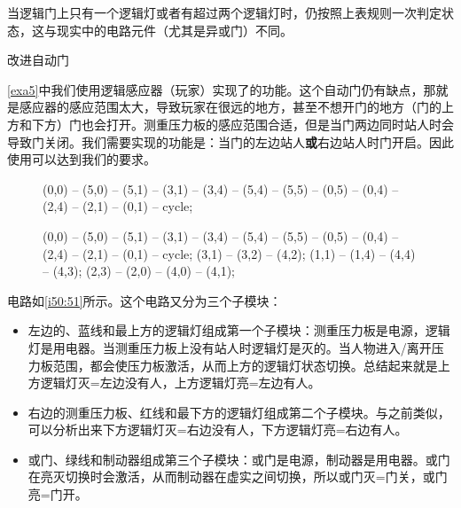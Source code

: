 \begin{remark*}{}{}
  当逻辑门上只有一个逻辑灯或者有超过两个逻辑灯时，仍按照上表规则一次判定状态，这与现实中的电路元件（尤其是异或门）不同。
\end{remark*}

\begin{example}{改进自动门}{}

  \autoref{exa5}中我们使用逻辑感应器（玩家）实现了的功能。这个自动门仍有缺点，那就是感应器的感应范围太大，导致玩家在很远的地方，甚至不想开门的地方（门的上方和下方）门也会打开。测重压力板的感应范围合适，但是当门两边同时站人时会导致门关闭。我们需要实现的功能是：当门的左边站人\textbf{或}右边站人时门开启。因此使用可以达到我们的要求。

  \begin{figure}[H]
    \centering
    \begin{tikzpictureC}[TRsch]
       (0,0) -- (5,0) -- (5,1) -- (3,1) -- (3,4) -- (5,4) -- (5,5) -- (0,5) -- (0,4) -- (2,4) -- (2,1) -- (0,1) -- cycle;
    \end{tikzpictureC}%
    \begin{tikzpictureC}[TRsch]
       (0,0) -- (5,0) -- (5,1) -- (3,1) -- (3,4) -- (5,4) -- (5,5) -- (0,5) -- (0,4) -- (2,4) -- (2,1) -- (0,1) -- cycle;
       (3,1) -- (3,2) -- (4,2);
       (1,1) -- (1,4) -- (4,4) -- (4,3);
       (2,3) -- (2,0) -- (4,0) -- (4,1);
    \end{tikzpictureC}%
    \caption{}
    \label{i50:51}
  \end{figure}

  电路如\autoref{i50:51}所示。这个电路又分为三个子模块：
  \begin{itemize}
    \item 左边的、蓝线和最上方的逻辑灯组成第一个子模块：测重压力板是电源，逻辑灯是用电器。当测重压力板上没有站人时逻辑灯是灭的。当人物进入/离开压力板范围，都会使压力板激活，从而上方的逻辑灯状态切换。总结起来就是上方逻辑灯灭=左边没有人，上方逻辑灯亮=左边有人。
    \item 右边的测重压力板、红线和最下方的逻辑灯组成第二个子模块。与之前类似，可以分析出来下方逻辑灯灭=右边没有人，下方逻辑灯亮=右边有人。
    \item 或门、绿线和制动器组成第三个子模块：或门是电源，制动器是用电器。或门在亮灭切换时会激活，从而制动器在虚实之间切换，所以或门灭=门关，或门亮=门开。
  \end{itemize}


\end{example}
